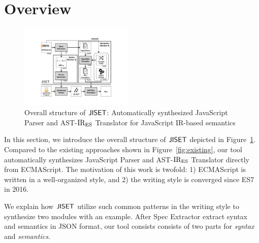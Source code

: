 \section{Overview}\label{sec:overview}
\begin{figure}
  \centering
  \includegraphics[width=0.48\textwidth]{img/overview.pdf}
  \caption{Overall structure of \( \text{\sf JISET} \): Automatically synthesized {\sf
    JavaScript Parser} and {\sf AST-\( \text{IR}_\text{ES} \) Translator} for JavaScript
    IR-based semantics}
  \label{fig:overview}
\vspace*{-1em}
\end{figure}

In this section, we introduce the overall structure of \( \text{\sf JISET} \) depicted in
Figure~\ref{fig:overview}.  Compared to the existing approaches shown in
Figure~\ref{fig:existing}, our tool automatically synthesizes {\sf JavaScript
Parser} and {\sf AST-\( \text{IR}_\text{ES} \) Translator} directly from ECMAScript. The
motivation of this work is twofold: 1) ECMAScript is written in a well-organized
style, and 2) the writing style is converged since ES7 in 2016.

We explain how \( \text{\sf JISET} \) utilize such common patterns in the writing style to
synthesize two modules with an example.  After {\sf Spec Extractor} extract
syntax and semantics in JSON format, our tool consists consists of two parts for
\textit{syntax} and \textit{semantics}.

